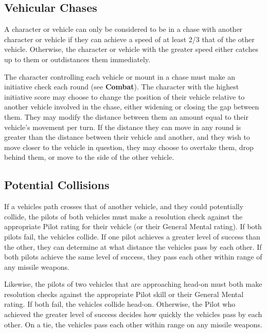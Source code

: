 \documentclass[oneside]{book}
\begin{document}
\begin{multicols}{2}

\subsection{Vehicular Chases}

A character or vehicle can only be considered to be in a chase with another character or vehicle if they can achieve a speed of at least 2/3 that of the other vehicle. Otherwise, the character or vehicle with the greater speed either catches up to them or outdistances them immediately.

The character controlling each vehicle or mount in a chase must make an initiative check each round (see \textbf{Combat}). The character with the highest initiative score may choose to change the position of their vehicle relative to another vehicle involved in the chase, either widening or closing the gap between them. They may modify the distance between them an amount equal to their vehicle's movement per turn. If the distance they can move in any round is greater than the distance between their vehicle and another, and they wish to move closer to the vehicle in question, they may choose to overtake them, drop behind them, or move to the side of the other vehicle.

\subsection{Potential Collisions}

If a vehicles path crosses that of another vehicle, and they could potentially collide, the pilots of both vehicles must make a resolution check against the appropriate Pilot rating for their vehicle (or their General Mental rating). If both pilots fail, the vehicles collide. If one pilot achieves a greater level of success than the other, they can determine at what distance the vehicles pass by each other. If both pilots achieve the same level of success, they pass each other within range of any missile weapons. 

Likewise, the pilots of two vehicles that are approaching head-on must both make resolution checks against the appropriate Pilot skill or their General Mental rating. If both fail, the vehicles collide head-on. Otherwise, the Pilot who achieved the greater level of success decides how quickly the vehicles pass by each other. On a tie, the vehicles pass each other within range on any missile weapons.


\end{multicols}
\end{document}
